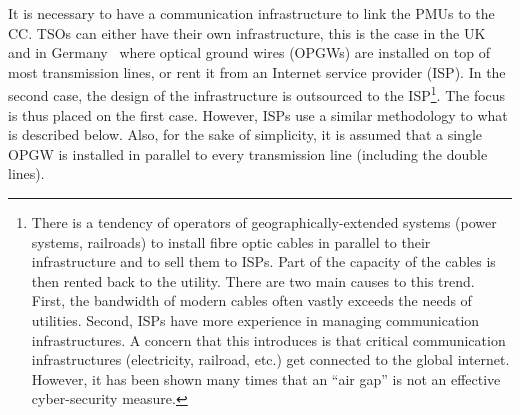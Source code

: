 It is necessary to have a communication infrastructure to link the PMUs to the CC. TSOs can either have their own infrastructure, this is \eg the case in the UK~\cite[p110]{bookUK_OPGW} and in Germany~\cite[p42]{ThesisInspire} where optical ground wires (OPGWs) are installed on top of most transmission lines, or rent it from an Internet service provider (ISP). In the second case, the design of the infrastructure is outsourced to the ISP\footnote{There is a tendency of operators of geographically-extended systems (power systems, railroads) to install fibre optic cables in parallel to their infrastructure and to sell them to ISPs. Part of the capacity of the cables is then rented back to the utility. There are two main causes to this trend. First, the bandwidth of modern cables often vastly exceeds the needs of utilities. Second, ISPs have more experience in managing communication infrastructures. A concern that this introduces is that critical communication infrastructures (electricity, railroad, etc.) get connected to the global internet. However, it has been shown many times that an ``air gap'' is not an effective cyber-security measure.}. The focus is thus placed on the first case. However, ISPs use a similar methodology to what is described below. Also, for the sake of simplicity, it is assumed that a single OPGW is installed in parallel to every transmission line (including the double lines).

